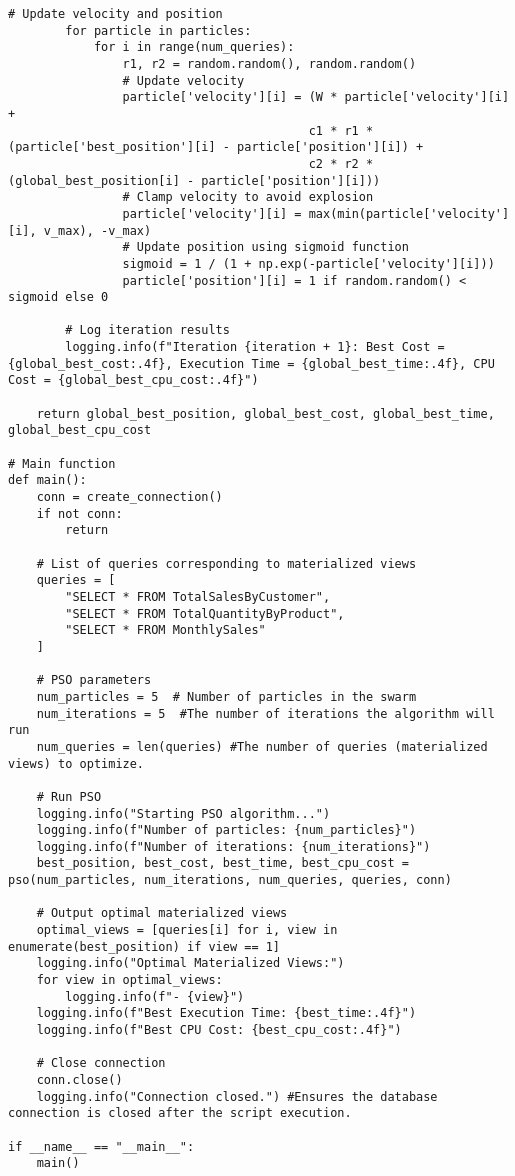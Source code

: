 \begin{lstlisting}[style=pythonstyle, caption={Python script to automate optimal view.}, label={lst:fullCode}]
        # Update velocity and position
        for particle in particles:
            for i in range(num_queries):
                r1, r2 = random.random(), random.random()
                # Update velocity
                particle['velocity'][i] = (W * particle['velocity'][i] +
                                          c1 * r1 * (particle['best_position'][i] - particle['position'][i]) +
                                          c2 * r2 * (global_best_position[i] - particle['position'][i]))
                # Clamp velocity to avoid explosion
                particle['velocity'][i] = max(min(particle['velocity'][i], v_max), -v_max)
                # Update position using sigmoid function
                sigmoid = 1 / (1 + np.exp(-particle['velocity'][i]))
                particle['position'][i] = 1 if random.random() < sigmoid else 0

        # Log iteration results
        logging.info(f"Iteration {iteration + 1}: Best Cost = {global_best_cost:.4f}, Execution Time = {global_best_time:.4f}, CPU Cost = {global_best_cpu_cost:.4f}")

    return global_best_position, global_best_cost, global_best_time, global_best_cpu_cost

# Main function
def main():
    conn = create_connection()
    if not conn:
        return

    # List of queries corresponding to materialized views
    queries = [
        "SELECT * FROM TotalSalesByCustomer",  
        "SELECT * FROM TotalQuantityByProduct",  
        "SELECT * FROM MonthlySales"  
    ]

    # PSO parameters
    num_particles = 5  # Number of particles in the swarm
    num_iterations = 5  #The number of iterations the algorithm will run
    num_queries = len(queries) #The number of queries (materialized views) to optimize.

    # Run PSO
    logging.info("Starting PSO algorithm...")
    logging.info(f"Number of particles: {num_particles}")
    logging.info(f"Number of iterations: {num_iterations}")
    best_position, best_cost, best_time, best_cpu_cost = pso(num_particles, num_iterations, num_queries, queries, conn)

    # Output optimal materialized views
    optimal_views = [queries[i] for i, view in enumerate(best_position) if view == 1]
    logging.info("Optimal Materialized Views:")
    for view in optimal_views:
        logging.info(f"- {view}")
    logging.info(f"Best Execution Time: {best_time:.4f}")
    logging.info(f"Best CPU Cost: {best_cpu_cost:.4f}")

    # Close connection
    conn.close()
    logging.info("Connection closed.") #Ensures the database connection is closed after the script execution.

if __name__ == "__main__":
    main()

\end{lstlisting}